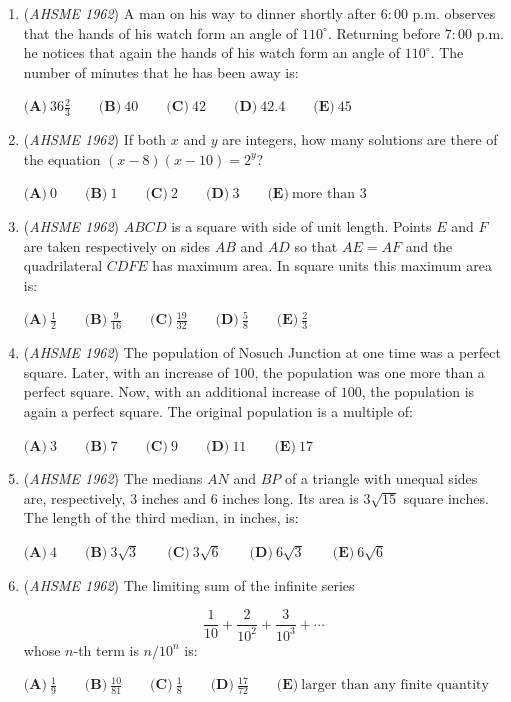 \begin{enumerate}
 $\textbf{(A)}\ \text{none} \qquad  \textbf{(B)}\ -2 < K < 1 \qquad  \textbf{(C)}\ -2\sqrt{2} < K < 2\sqrt{2} \qquad  \textbf{(D)}\ K > 1 \text{ or } K < -2 \qquad  \textbf{(E)}\ \text{all}$


	\item (\textit{AHSME 1962}) A man on his way to dinner shortly after $6{:}00$ p.m. observes that the hands of his watch form an angle of $110^\circ$. Returning before $7{:}00$ p.m. he notices that again the hands of his watch form an angle of $110^\circ$. The number of minutes that he has been away is:


 $\textbf{(A)}\ 36\frac{2}{3} \qquad  \textbf{(B)}\ 40 \qquad  \textbf{(C)}\ 42 \qquad  \textbf{(D)}\ 42.4 \qquad  \textbf{(E)}\ 45$


	\item (\textit{AHSME 1962}) If both $x$ and $y$ are integers, how many solutions are there of the equation $(x - 8)(x - 10) = 2^y$?


 $\textbf{(A)}\ 0 \qquad  \textbf{(B)}\ 1 \qquad  \textbf{(C)}\ 2 \qquad  \textbf{(D)}\ 3 \qquad  \textbf{(E)}\ \text{more than } 3$


	\item (\textit{AHSME 1962}) $ABCD$ is a square with side of unit length. Points $E$ and $F$ are taken respectively on sides $AB$ and $AD$ so that $AE = AF$ and the quadrilateral $CDFE$ has maximum area. In square units this maximum area is:


 $\textbf{(A)}\ \frac{1}{2} \qquad  \textbf{(B)}\ \frac{9}{16} \qquad  \textbf{(C)}\ \frac{19}{32} \qquad  \textbf{(D)}\ \frac{5}{8} \qquad  \textbf{(E)}\ \frac{2}{3}$


	\item (\textit{AHSME 1962}) The population of Nosuch Junction at one time was a perfect square. Later, with an increase of $100$, the population was one more than a perfect square. Now, with an additional increase of $100$, the population is again a perfect square. The original population is a multiple of:


 $\textbf{(A)}\ 3 \qquad  \textbf{(B)}\ 7 \qquad  \textbf{(C)}\ 9 \qquad  \textbf{(D)}\ 11 \qquad  \textbf{(E)}\ 17$


	\item (\textit{AHSME 1962}) The medians $AN$ and $BP$ of a triangle with unequal sides are, respectively, $3$ inches and $6$ inches long. Its area is $3\sqrt{15}$ square inches. The length of the third median, in inches, is:


 $\textbf{(A)}\ 4 \qquad  \textbf{(B)}\ 3\sqrt{3} \qquad  \textbf{(C)}\ 3\sqrt{6} \qquad  \textbf{(D)}\ 6\sqrt{3} \qquad  \textbf{(E)}\ 6\sqrt{6}$


	\item (\textit{AHSME 1962}) The limiting sum of the infinite series

 \[\frac{1}{10} + \frac{2}{10^2} + \frac{3}{10^3} + \cdots\]
whose $n$-th term is $n/10^n$ is:


 $\textbf{(A)}\ \frac{1}{9} \qquad  \textbf{(B)}\ \frac{10}{81} \qquad  \textbf{(C)}\ \frac{1}{8} \qquad  \textbf{(D)}\ \frac{17}{72} \qquad  \textbf{(E)}\ \text{larger than any finite quantity}$


\end{enumerate}